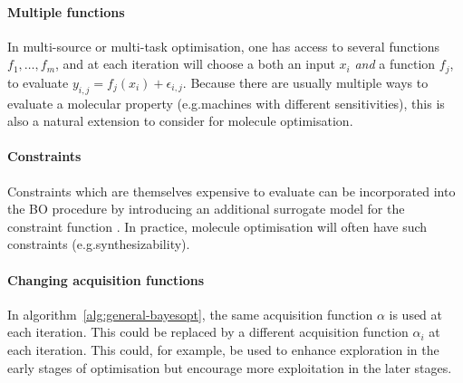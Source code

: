 \paragraph{Multiple functions}
In multi-source \citep{poloczek2017multi}
or multi-task \citep{swersky2013multi} optimisation,
one has access to several functions $f_1,\ldots,f_m$,
and at each iteration will choose a both an input $x_i$
\emph{and} a function $f_j$, to evaluate $y_{i,j }= f_j(x_i) + \epsilon_{i,j}$.
Because there are usually multiple ways to evaluate a molecular property
(e.g.\@ machines with different sensitivities),
this is also a natural extension to consider for molecule optimisation.

\paragraph{Constraints}
Constraints which are themselves expensive to evaluate can be incorporated into the BO procedure
by introducing an additional surrogate model
for the constraint function \citep{gardner2014bayesian}.
In practice, molecule optimisation will often have such constraints
(e.g.\@ synthesizability).

\paragraph{Changing acquisition functions}
In algorithm~\ref{alg:general-bayesopt},
the same acquisition function $\alpha$ is used at each iteration.
This could be replaced by a different acquisition function $\alpha_i$ at each iteration.
This could, for example, be used to enhance exploration in the early stages of optimisation
but encourage more exploitation in the later stages.
